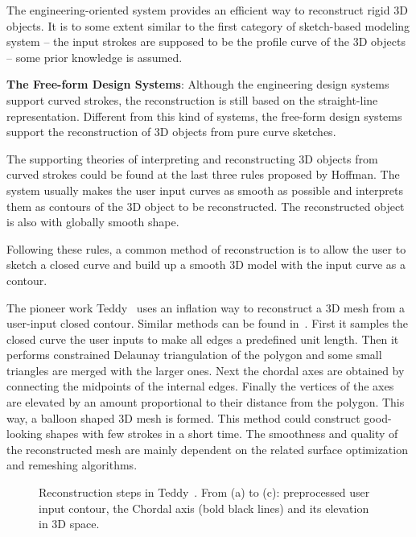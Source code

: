 The engineering-oriented system provides an efficient way to reconstruct rigid 3D objects. It is to some extent similar to the first category of sketch-based modeling system -- the input strokes are supposed to be the profile curve of the 3D objects -- some prior knowledge is assumed.

\textbf{The Free-form Design Systems}: Although the engineering design systems support curved strokes, the reconstruction is still based on the straight-line representation. Different from this kind of systems, the free-form design systems support the reconstruction of 3D objects from pure curve sketches.

The supporting theories of interpreting and reconstructing 3D objects from curved strokes could be found at the last three rules proposed by Hoffman. The system usually makes the user input curves as smooth as possible and interprets them as contours of the 3D object to be reconstructed. The reconstructed object is also with globally smooth shape.

Following these rules, a common method of reconstruction is to allow the user to sketch a closed curve and build up a smooth 3D model with the input curve as a contour.

The pioneer work Teddy~\cite{IMT99} uses an inflation way to reconstruct a 3D mesh from a user-input closed contour. Similar methods can be found in~\cite{IH01,IH03,NISA07,MI07,NPAI09}. First it samples the closed curve the user inputs to make all edges a predefined unit length. Then it performs constrained Delaunay triangulation of the polygon and some small triangles are merged with the larger ones. Next the chordal axes are obtained by connecting the midpoints of the internal edges. Finally the vertices of the axes are elevated by an amount proportional to their distance from the polygon. This way, a balloon shaped 3D mesh is formed. This method could construct good-looking shapes with few strokes in a short time. The smoothness and quality of the reconstructed mesh are mainly dependent on the related surface optimization and remeshing algorithms.

\begin{figure} [htbp]
  \centering
  \caption{Reconstruction steps in Teddy~\cite{IMT99}. From (a) to (c): preprocessed user input contour, the Chordal axis (bold black lines) and its elevation in 3D space.}
  \label{fig:Teddy} %
\end{figure}

